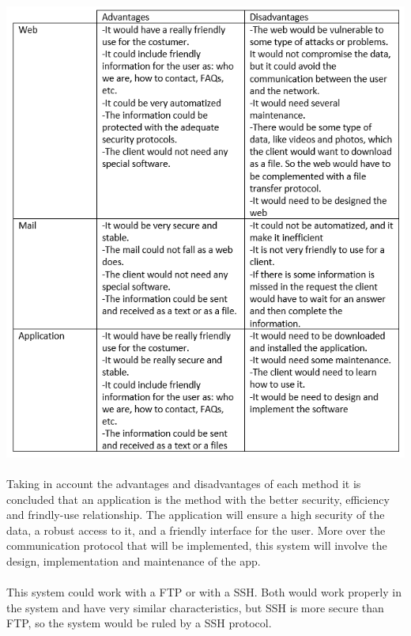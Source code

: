 \begin{center}
\includegraphics[scale=1]{Parts/tabla}
\end{center}

\paragraph{}
Taking in account the advantages and disadvantages of each method it is concluded that an application is the method with the better security, efficiency and frindly-use relationship. The application will ensure a high security of the data, a robust access to it, and a friendly interface for the user. More over the communication protocol that will be implemented, this system will involve the design, implementation and maintenance of the app. 
\paragraph{}
This system could work with a FTP or with a SSH. Both would work properly in the system and have very similar characteristics, but SSH is more secure than FTP, so the system would be ruled by a SSH protocol.



